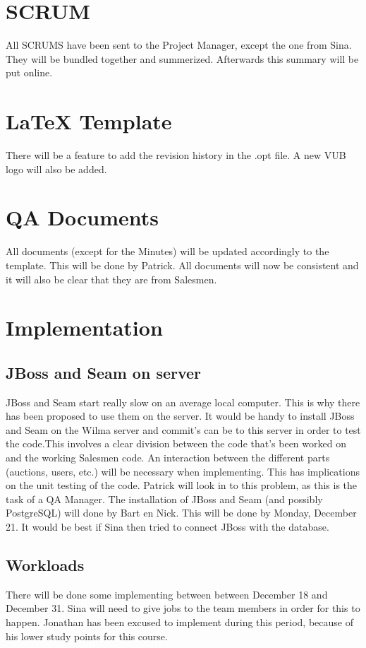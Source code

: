 \documentclass[a4paper, 12pt]{article}
\begin{document}
	\section{SCRUM}
All SCRUMS have been sent to the Project Manager, except the one from Sina. They will be bundled together and summerized. Afterwards this summary will be put online.
 
	\section{\LaTeX{} Template}
There will be a feature to add the revision history in the .opt file. A new VUB logo will also be added.
	\section{QA Documents}
All documents (except for the Minutes) will be updated accordingly to the template. This will be done by Patrick. All documents will now be consistent and it will also be clear that they are from Salesmen. 
	\section{Implementation}
		\subsection{JBoss and Seam on server}
		JBoss and Seam start really slow on an average local computer. This is why there has been proposed to use them on the server. It would be handy to install JBoss and Seam on the Wilma server and commit's can be to this server in order to test the code.This involves a clear division between the code that's been worked on and the working Salesmen code. An interaction between the different parts (auctions, users, etc.) will be necessary when implementing. This has  implications on the unit testing of the code. Patrick will look in to this problem, as this is the task of a QA Manager. The installation of JBoss and Seam (and possibly PostgreSQL) will done by Bart en Nick. This will be done by Monday, December 21. It would be best if Sina then tried to connect JBoss with the database. 
		\subsection{Workloads}
There will be done some implementing between between December 18 and December 31. Sina will need to give jobs to the team members in order for this to happen. Jonathan has been excused to implement during this period, because of his lower study points for this course.
\end{document}

